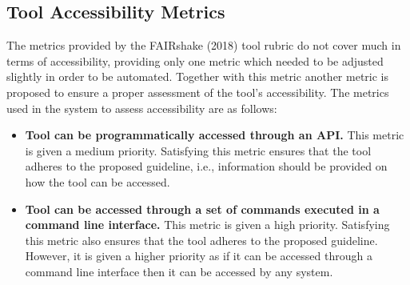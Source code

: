 \documentclass{cisfyp}
\begin{document}
\subsection{Tool Accessibility Metrics}
The metrics provided by the FAIRshake (2018) tool rubric do not cover much in terms of accessibility, providing only one metric which needed to be adjusted slightly in order to be automated. Together with this metric another metric is proposed to ensure a proper assessment of the tool's accessibility.\newline
The metrics used in the system to assess accessibility are as follows:
\begin{itemize}
	\item \textbf{Tool can be programmatically accessed through an API.}\newline
	This metric is given a medium priority. Satisfying this metric ensures that the tool adheres to the proposed guideline, i.e., information should be provided on how the tool can be accessed.
	
	\item \textbf{Tool can be accessed through a set of commands executed in a command line interface.}\newline
	This metric is given a high priority. Satisfying this metric also ensures that the tool adheres to the proposed guideline. However, it is given a higher priority as if it can be accessed through a command line interface then it can be accessed by any system.
\end{itemize}
\end{document}
